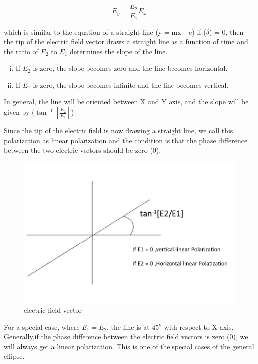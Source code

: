 \begin{equation}
E_y = \frac{E_2}{E_1}E_x
\end{equation}

which is similar to the equation of a straight line (y = mx +c)
if ($\delta$) = 0, then the tip of the electric field vector draws a straight line as a function of time and the ratio of $ E_2 $ to $ E_1 $ determines the slope of the line.
\begin{enumerate}[(i)]
\item If $ E_2 $ is zero, the slope becomes zero and the line becomes horizontal.
\item If $ E_1 $ is zero, the slope becomes infinite and the line becomes vertical.
\end{enumerate} 
In general, the line will be oriented between X and Y axis, and the slope will be given by ($ \tan^{-1}[\frac{E_2}{E_1}]$)

Since the tip of the electric field is now drawing a straight line, we call this polarization as linear polarization and the condition is that the phase difference between the two electric vectors should be zero (0).
\begin{figure}[h]
\centering
\includegraphics[width=.8\linewidth]{./graphics/electric2}
\caption{electric field vector}
\end{figure}

For a special case, where $  E_1=E_2 $, the line is at $ 45^{o}$ with respect to X axis.
Generally,if the phase difference between the electric field vectors is zero (0), we will always get a linear polarization. This is one of the special cases of the general ellipse.

